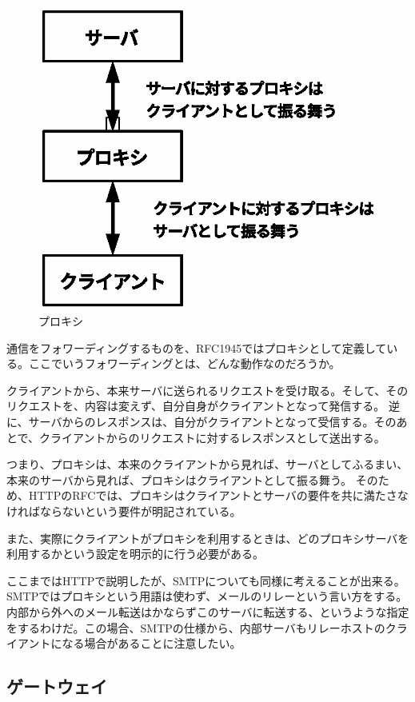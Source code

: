 \begin{figure}[htbp]
	\includegraphics[width=12cm,clip]{draw/fig3.eps}
	\caption{プロキシ}
	\label{fig:proxy}
\end{figure}

通信をフォワーディングするものを、RFC1945ではプロキシとして定義している。ここでいうフォワーディングとは、どんな動作なのだろうか。

クライアントから、本来サーバに送られるリクエストを受け取る。そして、そのリクエストを、内容は変えず、自分自身がクライアントとなって発信する。
逆に、サーバからのレスポンスは、自分がクライアントとなって受信する。そのあとで、クライアントからのリクエストに対するレスポンスとして送出する。

つまり、プロキシは、本来のクライアントから見れば、サーバとしてふるまい、本来のサーバから見れば、プロキシはクライアントとして振る舞う。
そのため、HTTPのRFCでは、プロキシはクライアントとサーバの要件を共に満たさなければならないという要件が明記されている。

また、実際にクライアントがプロキシを利用するときは、どのプロキシサーバを利用するかという設定を明示的に行う必要がある。

ここまではHTTPで説明したが、SMTPについても同様に考えることが出来る。SMTPではプロキシという用語は使わず、メールのリレーという言い方をする。
内部から外へのメール転送はかならずこのサーバに転送する、というような指定をするわけだ。この場合、SMTPの仕様から、内部サーバもリレーホストのクライアントになる場合があることに注意したい。

\subsection{ゲートウェイ}

